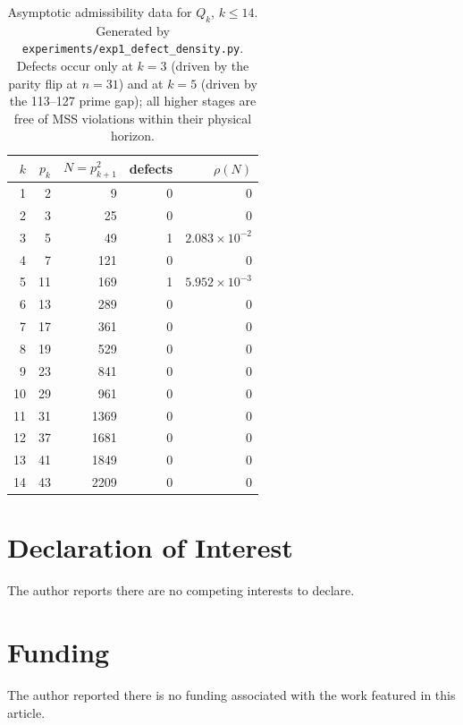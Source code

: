 \documentclass[11pt,a4paper]{article}
\theoremstyle{definition}
\begin{document}
\begin{table}[h]
  \centering
  \begin{tabular}{rrrrr}
    \toprule
    $k$ & $p_k$ & $N = p_{k+1}^2$ & defects & $\rho(N)$ \\
    \midrule
    1  & 2  & 9    & 0 & $0$ \\
    2  & 3  & 25   & 0 & $0$ \\
    3  & 5  & 49   & 1 & $2.083 \times 10^{-2}$ \\
    4  & 7  & 121  & 0 & $0$ \\
    5  & 11 & 169  & 1 & $5.952 \times 10^{-3}$ \\
    6  & 13 & 289  & 0 & $0$ \\
    7  & 17 & 361  & 0 & $0$ \\
    8  & 19 & 529  & 0 & $0$ \\
    9  & 23 & 841  & 0 & $0$ \\
    10 & 29 & 961  & 0 & $0$ \\
    11 & 31 & 1369 & 0 & $0$ \\
    12 & 37 & 1681 & 0 & $0$ \\
    13 & 41 & 1849 & 0 & $0$ \\
    14 & 43 & 2209 & 0 & $0$ \\
    \bottomrule
  \end{tabular}
  \caption{Asymptotic admissibility data for $Q_k$, $k \leq 14$.
    Generated by \texttt{experiments/exp1\_defect\_density.py}. Defects
    occur only at $k = 3$ (driven by the parity flip at $n = 31$) and at
    $k = 5$ (driven by the 113--127 prime gap); all higher stages are
    free of MSS violations within their physical horizon.}
  \label{tab:defect}
\end{table}

\appendix


\section*{Declaration of Interest}
The author reports there are no competing interests to declare.

\section*{Funding}
The author reported there is no funding associated with the work
featured in this article.
\end{document}
